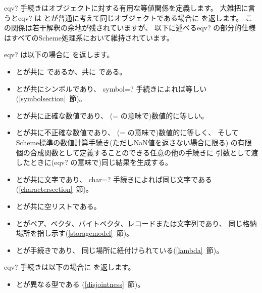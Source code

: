 \begin{entry}{%
}

{\cf eqv?} 手続きはオブジェクトに対する有用な等値関係を定義します。
大雑把に言うと{\cf eqv?} は
とが普通に考えて同じオブジェクトである場合に %
\schtrue{}を返します。
この関係は若干解釈の余地が残されていますが、
以下に述べる{\cf eqv?} の部分的仕様はすべてのScheme処理系において維持されています。


{\cf eqv?} は以下の場合に \schtrue{}を返します。

\begin{itemize}
\item {}とが共に \schtrue{}であるか、共に \schfalse{}である。

\item {}とが共にシンボルであり、
{\cf symbol=?} 手続きによれば等しい(\ref{symbolsection}~節)。

\item {}とが共に正確な数値であり、
({\cf =} の意味で)数値的に等しい。

\item {}とが共に不正確な数値であり、
({\cf =} の意味で)数値的に等しく、
そしてScheme標準の数値計算手続き(ただしNaN値を返さない場合に限る)
の有限個の合成関数として定義することのできる任意の他の手続きに
引数として渡したときに({\cf eqv?} の意味で)同じ結果を生成する。

\item {}とが共に文字であり、
{\cf char=?} 手続きによれば同じ文字である(\ref{charactersection}~節)。

\item {}とが共に空リストである。

\item {}とがペア、ベクタ、バイトベクタ、レコードまたは文字列であり、
同じ格納場所を指し示す(\ref{storagemodel}~節)。

\item {}とが手続きであり、
同じ場所に紐付けられている(\ref{lambda}~節)。
\end{itemize}

{\cf eqv?} 手続きは以下の場合に \schfalse{}を返します。

\begin{itemize}
\item {}とが異なる型である
(\ref{disjointness}~節)。


\end{itemize}
\end{entry}
